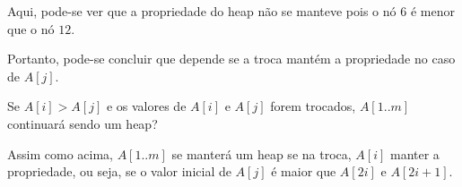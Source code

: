 \documentclass[12pt,a4paper]{article}
\begin{document}
    Aqui, pode-se ver que a propriedade do heap não se manteve pois o nó $6$ é
    menor que o nó $12$.

    Portanto, pode-se concluir que depende se a troca mantém a propriedade no
    caso de $A[j]$.

     Se $A[i] > A[j]$ e os valores de $A[i]$ e
    $A[j]$ forem trocados, $A[1 . . m]$ continuará sendo um heap?

    Assim como acima, $A[1..m]$ se manterá um heap se na troca, $A[i]$ manter a
    propriedade, ou seja, se o valor inicial de $A[j]$ é maior que $A[2i]$ e
    $A[2i + 1]$.

\end{document}
